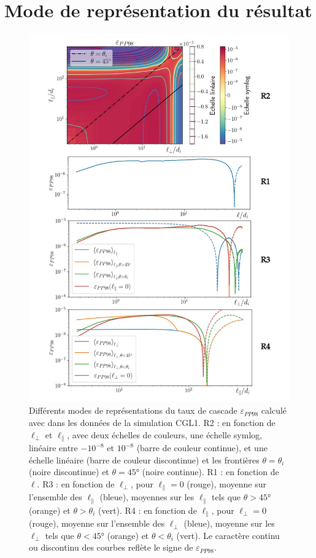 \section{Mode de représentation du résultat}
 \label{sec-313}
 \begin{figure}[!ht]
  \centering
 \includegraphics[width=0.75\linewidth,trim=1cm 0.5cm 1cm 0.5cm, clip=true]{./Mainmatter/Part_3/images_ch1/rep_CGL1}
 \cprotect\caption{Différents modes de représentations du taux de cascade \ensuremath{\varepsilon_{PP98}} calculé avec  dans les données de la simulation CGL1. R2 :  en fonction de \ensuremath{\ell_{\perp}} et \ensuremath{\ell_{\parallel}}, avec deux échelles de couleurs, une échelle symlog, linéaire entre \ensuremath{-10^{-8}} et \ensuremath{10^{-8}} (barre de couleur continue), et une échelle linéaire (barre de couleur discontinue) et les frontières \ensuremath{\theta = \theta_i} (noire discontinue) et \ensuremath{\theta = \ang{45}} (noire continue). R1 :  en fonction de \ensuremath{\ell}. R3 :  en fonction de \ensuremath{\ell_{\perp}}, pour \ensuremath{\ell_{\parallel} = 0} (rouge), moyenne sur l'ensemble des \ensuremath{\ell_{\parallel}} (bleue), moyennes sur les \ensuremath{\ell_{\parallel}} tels que \ensuremath{\theta > \ang{45}} (orange) et \ensuremath{\theta > \theta_i} (vert). R4 :  en fonction de \ensuremath{\ell_{\parallel}}, pour \ensuremath{\ell_{\perp} = 0} (rouge), moyenne sur l'ensemble des \ensuremath{\ell_{\perp}} (bleue), moyenne sur les \ensuremath{\ell_{\perp}} tels que \ensuremath{\theta < \ang{45}} (orange) et \ensuremath{\theta < \theta_i} (vert). Le caractère continu ou discontinu des courbes  reflète le signe de \ensuremath{\varepsilon_{PP98}}.}
 \label{fig:rep_CGL1}
 \end{figure}
